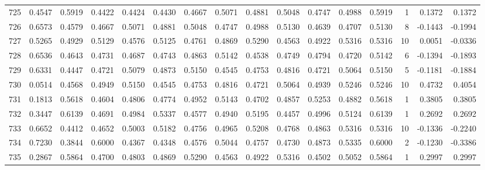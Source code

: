 \begin{tabular}{lrrrrrrrrrrrrrrr}
725 &      0.4547 &  0.5919 &  0.4422 &  0.4424 &  0.4430 &  0.4667 &  0.5071 &  0.4881 &  0.5048 &  0.4747 &   0.4988 &     0.5919 &      1 &                    0.1372 &                     0.1372 \\
726 &      0.6573 &  0.4579 &  0.4667 &  0.5071 &  0.4881 &  0.5048 &  0.4747 &  0.4988 &  0.5130 &  0.4639 &   0.4707 &     0.5130 &      8 &                   -0.1443 &                    -0.1994 \\
727 &      0.5265 &  0.4929 &  0.5129 &  0.4576 &  0.5125 &  0.4761 &  0.4869 &  0.5290 &  0.4563 &  0.4922 &   0.5316 &     0.5316 &     10 &                    0.0051 &                    -0.0336 \\
728 &      0.6536 &  0.4643 &  0.4731 &  0.4687 &  0.4743 &  0.4863 &  0.5142 &  0.4538 &  0.4749 &  0.4794 &   0.4720 &     0.5142 &      6 &                   -0.1394 &                    -0.1893 \\
729 &      0.6331 &  0.4447 &  0.4721 &  0.5079 &  0.4873 &  0.5150 &  0.4545 &  0.4753 &  0.4816 &  0.4721 &   0.5064 &     0.5150 &      5 &                   -0.1181 &                    -0.1884 \\
730 &      0.0514 &  0.4568 &  0.4949 &  0.5150 &  0.4545 &  0.4753 &  0.4816 &  0.4721 &  0.5064 &  0.4939 &   0.5246 &     0.5246 &     10 &                    0.4732 &                     0.4054 \\
731 &      0.1813 &  0.5618 &  0.4604 &  0.4806 &  0.4774 &  0.4952 &  0.5143 &  0.4702 &  0.4857 &  0.5253 &   0.4882 &     0.5618 &      1 &                    0.3805 &                     0.3805 \\
732 &      0.3447 &  0.6139 &  0.4691 &  0.4984 &  0.5337 &  0.4577 &  0.4940 &  0.5195 &  0.4457 &  0.4996 &   0.5124 &     0.6139 &      1 &                    0.2692 &                     0.2692 \\
733 &      0.6652 &  0.4412 &  0.4652 &  0.5003 &  0.5182 &  0.4756 &  0.4965 &  0.5208 &  0.4768 &  0.4863 &   0.5316 &     0.5316 &     10 &                   -0.1336 &                    -0.2240 \\
734 &      0.7230 &  0.3844 &  0.6000 &  0.4367 &  0.4348 &  0.4576 &  0.5044 &  0.4757 &  0.4730 &  0.4873 &   0.5335 &     0.6000 &      2 &                   -0.1230 &                    -0.3386 \\
735 &      0.2867 &  0.5864 &  0.4700 &  0.4803 &  0.4869 &  0.5290 &  0.4563 &  0.4922 &  0.5316 &  0.4502 &   0.5052 &     0.5864 &      1 &                    0.2997 &                     0.2997 \\

\end{tabular}
